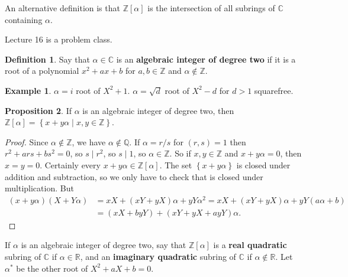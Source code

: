 \documentclass{article}
\newcommand{\Z}{\mathbb{Z}}
\newcommand{\Q}{\mathbb{Q}}
\newcommand{\R}{\mathbb{R}}
\newcommand{\C}{\mathbb{C}}
\newcommand{\rb}[1]{\left( #1 \right)}
\renewcommand{\sb}[1]{\left[ #1 \right]}
\newcommand{\cb}[1]{\left\{ #1 \right\}}
\theoremstyle{definition}\newtheorem{definition}{Definition}
\theoremstyle{definition}\newtheorem*{remark}{Remark}
\theoremstyle{definition}\newtheorem*{example}{Example}
\theoremstyle{definition}\newtheorem*{note}{Note}
\newtheorem{proposition}[definition]{Proposition}
\begin{document}
An alternative definition is that $ \Z\sb{\alpha} $ is the intersection of all subrings of $ \C $ containing $ \alpha $.


Lecture 16 is a problem class.


\begin{definition}
Say that $ \alpha \in \C $ is an \textbf{algebraic integer of degree two} if it is a root of a polynomial $ x^2 + ax + b $ for $ a, b \in \Z $ and $ \alpha \notin \Z $.
\end{definition}

\begin{example}
$ \alpha = i $ root of $ X^2 + 1 $. $ \alpha = \sqrt{d} $ root of $ X^2 - d $ for $ d > 1 $ squarefree.
\end{example}

\begin{proposition}
If $ \alpha $ is an algebraic integer of degree two, then $ \Z\sb{\alpha} = \cb{x + y\alpha \mid x, y \in \Z} $.
\end{proposition}

\begin{proof}
Since $ \alpha \notin \Z $, we have $ \alpha \notin \Q $. If $ \alpha = r / s $ for $ \rb{r, s} = 1 $ then $ r^2 + ars + bs^2 = 0 $, so $ s \mid r^2 $, so $ s \mid 1 $, so $ \alpha \in \Z $. So if $ x, y \in \Z $ and $ x + y\alpha = 0 $, then $ x = y = 0 $. Certainly every $ x + y\alpha \in \Z\sb{\alpha} $. The set $ \cb{x + y\alpha} $ is closed under addition and subtraction, so we only have to check that is closed under multiplication. But
\begin{align*}
\rb{x + y\alpha}\rb{X + Y\alpha}
& = xX + \rb{xY + yX}\alpha + yY\alpha^2
= xX + \rb{xY + yX}\alpha + yY\rb{a\alpha + b} \\
& = \rb{xX + byY} + \rb{xY + yX + ayY}\alpha.
\end{align*}
\end{proof}

If $ \alpha $ is an algebraic integer of degree two, say that $ \Z\sb{\alpha} $ is a \textbf{real quadratic} subring of $ \C $ if $ \alpha \in \R $, and an \textbf{imaginary quadratic} subring of $ \C $ if $ \alpha \notin \R $. Let $ \alpha^* $ be the other root of $ X^2 + aX + b = 0 $.
\end{document}
